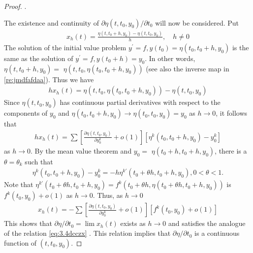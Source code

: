 \documentclass{article}
\begin{document}
\begin{proof}
.

The existence and continuity of $\partial \eta\left(t, t_{0}, y_{0}\right) / \partial t_{0}$ will now be considered. Put
\begin{align*}
x_{h}(t)=\frac{\eta\left(t, t_{0}+h, y_{0}\right)-\eta\left(t, t_{0}, y_{0}\right)}{h}, \quad h \neq 0
\end{align*}
The solution of the initial value problem $y^{\prime}=f, y\left(t_{0}\right)=\eta\left(t_{0}, t_{0}+h, y_{0}\right)$ is the same as the solution of $y^{\prime}=f, y\left(t_{0}+h\right)=y_{0}$. In other words,  $\eta\left(t, t_{0}+h, y_{0}\right)=$ $\eta\left(t, t_{0}, \eta\left(t_{0}, t_{0}+h, y_{0}\right)\right)$ (see also the inverse map in \cref{re:jmdfafdaa}). Thus we have 
\begin{align*}
h x_{h}(t)=\eta\left(t, t_{0}, \eta\left(t_{0}, t_{0}+h, y_{0}\right)\right)-\eta\left(t, t_{0}, y_{0}\right)
\end{align*}
Since $\eta\left(t, t_{0}, y_{0}\right)$ has continuous partial derivatives with respect to the components of $y_{0}$ and $\eta\left(t_{0}, t_{0}+h, y_{0}\right) \rightarrow \eta\left(t_{0}, t_{0}, y_{0}\right)=y_{0}$ as $h \rightarrow 0$, it follows that
\begin{align*}
h x_{h}(t)=\sum\left[\frac{\partial \eta\left(t, t_{0}, y_{0}\right)}{\partial y_{0}^{k}}+o(1)\right]\left[\eta^{k}\left(t_{0}, t_{0}+h, y_{0}\right)-y_{0}^{k}\right]
\end{align*}
as $h \rightarrow 0 .$ By the mean value theorem and $y_{0}=$ $\eta\left(t_{0}+h, t_{0}+h, y_{0}\right)$, there is a $\theta=\theta_{k}$ such that
\begin{align*}
\eta^{k}\left(t_{0}, t_{0}+h, y_{0}\right)-y_{0}^{k}=-h \eta^{k{\prime}}\left(t_{0}+\theta h, t_{0}+h, y_{0}\right), 0<\theta<1 .
\end{align*}
Note that $\eta^{k{\prime}}\left(t_{0}+\theta h, t_{0}+h, y_{0}\right)=f^{k}\left(t_{0}+\theta h, \eta\left(t_{0}+\theta h, t_{0}+h, y_{0}\right)\right)$ is $f^{k}\left(t_{0}, y_{0}\right)+o(1)$ as $h \rightarrow 0 .$ Thus, as $h \rightarrow 0$
\begin{align*}
x_{h}(t)=-\sum\left[\frac{\partial \eta\left(t, t_{0}, y_{0}\right)}{\partial y_{0}^{k}}+o(1)\right]\left[f^{k}\left(t_{0}, y_{0}\right)+o(1)\right]
\end{align*}
This shows that $\partial \eta / \partial t_{0}=\lim x_{h}(t)$ exists as $h \rightarrow 0$ and satisfies the analogue of the relation \cref{eq:3.4dcczx} . This relation implies that $\partial \eta / \partial t_{0}$ is a continuous function of $\left(t, t_{0}, y_{0}\right)$.


\end{proof}
\end{document}
